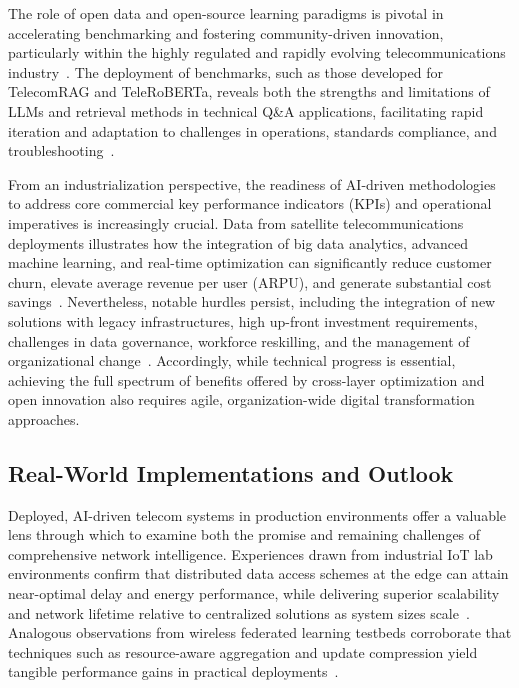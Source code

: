 \documentclass[sigconf]{acmart}
\begin{document}
The role of open data and open-source learning paradigms is pivotal in accelerating benchmarking and fostering community-driven innovation, particularly within the highly regulated and rapidly evolving telecommunications industry~\cite{ref11, ref21, ref22, ref23}. The deployment of benchmarks, such as those developed for TelecomRAG and TeleRoBERTa, reveals both the strengths and limitations of LLMs and retrieval methods in technical Q\&A applications, facilitating rapid iteration and adaptation to challenges in operations, standards compliance, and troubleshooting~\cite{ref23, ref29}.

From an industrialization perspective, the readiness of AI-driven methodologies to address core commercial key performance indicators (KPIs) and operational imperatives is increasingly crucial. Data from satellite telecommunications deployments illustrates how the integration of big data analytics, advanced machine learning, and real-time optimization can significantly reduce customer churn, elevate average revenue per user (ARPU), and generate substantial cost savings~\cite{ref49}. Nevertheless, notable hurdles persist, including the integration of new solutions with legacy infrastructures, high up-front investment requirements, challenges in data governance, workforce reskilling, and the management of organizational change~\cite{ref49}. Accordingly, while technical progress is essential, achieving the full spectrum of benefits offered by cross-layer optimization and open innovation also requires agile, organization-wide digital transformation approaches.

\subsection{Real-World Implementations and Outlook}

Deployed, AI-driven telecom systems in production environments offer a valuable lens through which to examine both the promise and remaining challenges of comprehensive network intelligence. Experiences drawn from industrial IoT lab environments confirm that distributed data access schemes at the edge can attain near-optimal delay and energy performance, while delivering superior scalability and network lifetime relative to centralized solutions as system sizes scale~\cite{ref14}. Analogous observations from wireless federated learning testbeds corroborate that techniques such as resource-aware aggregation and update compression yield tangible performance gains in practical deployments~\cite{ref12}.
\end{document}
